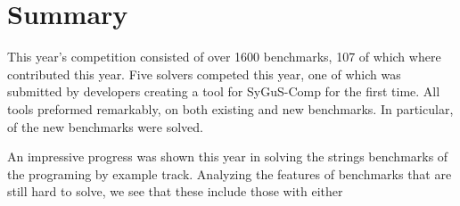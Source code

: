 \section{Summary}
\label{sec:discussion}

This year's competition consisted of over 1600 benchmarks,
107 of which where contributed this year.
Five solvers competed this year, one of which was submitted by developers creating a tool for SyGuS-Comp for the first time.
All tools preformed remarkably, on both existing and new benchmarks.
In particular,  of the new benchmarks were solved.

An impressive progress was shown this year in solving the strings benchmarks of the programing by example track.
Analyzing the features of benchmarks that are still hard to solve,
we see that these include those with either 
